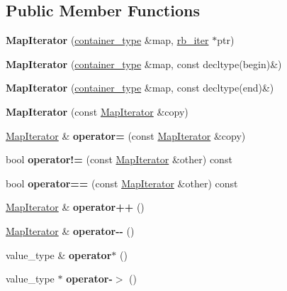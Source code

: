 \subsection*{Public Member Functions}
\begin{DoxyCompactItemize}
\item 
\mbox{\label{classMapIterator_a4a597df0199f1efc959b087be5a3c0a1}} 
{\bfseries Map\+Iterator} (\hyperlink{classMap}{container\+\_\+type} \&map, \hyperlink{structrb__iter}{rb\+\_\+iter} $\ast$ptr)
\item 
\mbox{\label{classMapIterator_a43fcc4ceaf1341a460fe10f0f8c1970e}} 
{\bfseries Map\+Iterator} (\hyperlink{classMap}{container\+\_\+type} \&map, const decltype(begin)\&)
\item 
\mbox{\label{classMapIterator_a6d34d33e264c28ea94b63bc0fcb2d630}} 
{\bfseries Map\+Iterator} (\hyperlink{classMap}{container\+\_\+type} \&map, const decltype(end)\&)
\item 
\mbox{\label{classMapIterator_a5861ef9d22090c35f7c3a0287c701afd}} 
{\bfseries Map\+Iterator} (const \hyperlink{classMapIterator}{Map\+Iterator} \&copy)
\item 
\mbox{\label{classMapIterator_a5315a6bb774cd431a6dbe41be56828e6}} 
\hyperlink{classMapIterator}{Map\+Iterator} \& {\bfseries operator=} (const \hyperlink{classMapIterator}{Map\+Iterator} \&copy)
\item 
\mbox{\label{classMapIterator_adf98d3f682253cb4b8e64a1cdc24d7d1}} 
bool {\bfseries operator!=} (const \hyperlink{classMapIterator}{Map\+Iterator} \&other) const
\item 
\mbox{\label{classMapIterator_a1c266e0517a5791e791b327d40f5ce99}} 
bool {\bfseries operator==} (const \hyperlink{classMapIterator}{Map\+Iterator} \&other) const
\item 
\mbox{\label{classMapIterator_a5d56804c2f1d6132b5668a4e5ee699c5}} 
\hyperlink{classMapIterator}{Map\+Iterator} \& {\bfseries operator++} ()
\item 
\mbox{\label{classMapIterator_a3584d6f39ef2b74ceda095cb18e9e614}} 
\hyperlink{classMapIterator}{Map\+Iterator} \& {\bfseries operator-\/-\/} ()
\item 
\mbox{\label{classMapIterator_a5325635088a46c712a6e91026a252906}} 
value\+\_\+type \& {\bfseries operator$\ast$} ()
\item 
\mbox{\label{classMapIterator_a6ad9a230f77f15bfd6ade75e5b95bfb0}} 
value\+\_\+type $\ast$ {\bfseries operator-\/$>$} ()
\end{DoxyCompactItemize}
